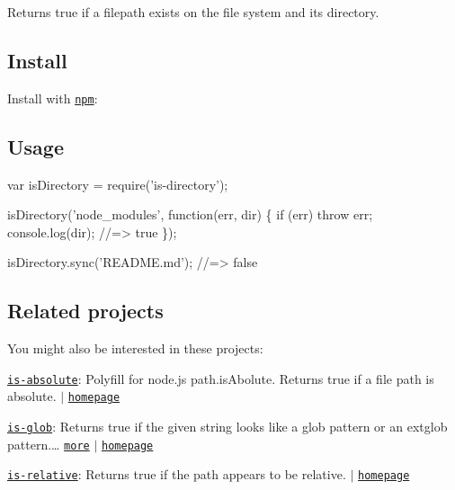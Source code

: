 Returns true if a filepath exists on the file system and it\textquotesingle{}s directory.

\subsection*{Install}

Install with \href{https://www.npmjs.com/}{\tt npm}\+:




\subsection*{Usage}


\begin{DoxyCode}
var isDirectory = require('is-directory');

isDirectory('node\_modules', function(err, dir) \{
  if (err) throw err;
  console.log(dir);
  //=> true
\});

isDirectory.sync('README.md');
//=> false
\end{DoxyCode}


\subsection*{Related projects}

You might also be interested in these projects\+:


\begin{DoxyItemize}
\item \href{https://www.npmjs.com/package/is-absolute}{\tt is-\/absolute}\+: Polyfill for node.\+js {\ttfamily path.\+is\+Abolute}. Returns true if a file path is absolute. $\vert$ \href{https://github.com/jonschlinkert/is-absolute}{\tt homepage}
\item \href{https://www.npmjs.com/package/is-glob}{\tt is-\/glob}\+: Returns {\ttfamily true} if the given string looks like a glob pattern or an extglob pattern.\+… \href{https://www.npmjs.com/package/is-glob}{\tt more} $\vert$ \href{https://github.com/jonschlinkert/is-glob}{\tt homepage}
\item \href{https://www.npmjs.com/package/is-relative}{\tt is-\/relative}\+: Returns {\ttfamily true} if the path appears to be relative. $\vert$ \href{https://github.com/jonschlinkert/is-relative}{\tt homepage}
\end{DoxyItemize}

